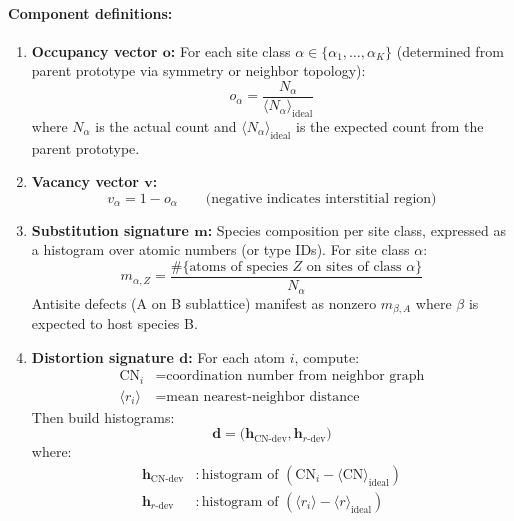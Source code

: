 \documentclass[11pt]{article}
\begin{document}
\paragraph{Component definitions:}
\begin{enumerate}
  \item \textbf{Occupancy vector $\mathbf{o}$:}
    For each site class $\alpha \in \{\alpha_1, \ldots, \alpha_K\}$ (determined
    from parent prototype via symmetry or neighbor topology):
    \begin{equation}
    o_\alpha = \frac{N_\alpha}{\langle N_\alpha \rangle_{\text{ideal}}}
    \end{equation}
    where $N_\alpha$ is the actual count and $\langle N_\alpha \rangle_{\text{ideal}}$
    is the expected count from the parent prototype.

  \item \textbf{Vacancy vector $\mathbf{v}$:}
    \begin{equation}
    v_\alpha = 1 - o_\alpha
    \qquad \text{(negative indicates interstitial region)}
    \end{equation}

  \item \textbf{Substitution signature $\mathbf{m}$:}
    Species composition per site class, expressed as a histogram over atomic
    numbers (or type IDs). For site class $\alpha$:
    \begin{equation}
    m_{\alpha,Z} = \frac{\#\{\text{atoms of species } Z \text{ on sites of class } \alpha\}}
                        {N_\alpha}
    \end{equation}
    Antisite defects (A on B sublattice) manifest as nonzero $m_{\beta,A}$ where
    $\beta$ is expected to host species B.

  \item \textbf{Distortion signature $\mathbf{d}$:}
    For each atom $i$, compute:
    \begin{align}
    \mathrm{CN}_i &= \text{coordination number from neighbor graph} \\
    \langle r_i \rangle &= \text{mean nearest-neighbor distance}
    \end{align}
    Then build histograms:
    \begin{equation}
    \mathbf{d} = \big(\mathbf{h}_{\mathrm{CN}\text{-dev}}, \mathbf{h}_{r\text{-dev}}\big)
    \end{equation}
    where:
    \begin{align}
    \mathbf{h}_{\mathrm{CN}\text{-dev}} &: \text{histogram of }
      (\mathrm{CN}_i - \langle \mathrm{CN} \rangle_{\text{ideal}}) \\
    \mathbf{h}_{r\text{-dev}} &: \text{histogram of }
      (\langle r_i \rangle - \langle r \rangle_{\text{ideal}})
    \end{align}
\end{enumerate}
\end{document}
